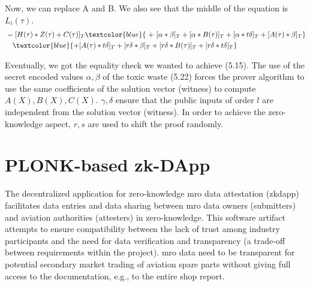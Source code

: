 Now, we can replace A and B. We also see that the middle of the equation is \(L_i(\tau)\).
 \begin{equation*}
     \begin{split}
     &=[H(\tau) * Z(\tau) + C(\tau)]_T \textcolor{blue}{\ +\  [\alpha * \beta]_T + [\alpha * B(\tau)]_T + [\alpha * t\delta]_T + [A(\tau) * \beta]_T} \\
     &\ \ \ \textcolor{blue}{+ [A(\tau) * t\delta]_T + [r\delta * \beta]_T + [r\delta * B(\tau)]_T + [r\delta * t\delta]_T}
     \end{split}
 \end{equation*}

Eventually, we got the equality check we wanted to achieve (5.15). The use of the secret encoded values \(\alpha, \beta\) of the toxic waste (5.22) forces the prover algorithm to use the same coefficients of the solution vector (witness) to compute \(A(X), B(X), C(X)\). \(\gamma, \delta\) ensure that the public inputs of order \(l\) are independent from the solution vector (witness). In order to achieve the zero-knowledge aspect, \(r, s\) are used to shift the proof randomly.

\section{PLONK-based zk-DApp}
The decentralized application for zero-knowledge \acrshort{mro} data attestation (\acrshort{zkdapp}) facilitates data entries and data sharing between \acrshort{mro} data owners (submitters) and aviation authorities (attesters) in zero-knowledge. This software artifact attempts to ensure compatibility between the lack of trust among industry participants and the need for data verification and transparency (a trade-off between requirements within the project). \acrshort{mro} data need to be transparent for potential secondary market trading of aviation spare parts without giving full access to the documentation, e.g., to the entire shop report.

